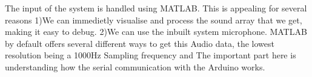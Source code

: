 The input of the system is handled using MATLAB. This is appealing for several reasons 
1)We can immedietly visualise and process the sound array that we get, making it easy to debug. 
2)We can use the inbuilt system microphone. 
MATLAB by default offers several different ways to get this Audio data, the lowest resolution being a 1000Hz Sampling frequency and 
The important part here is understanding how the serial communication with the Arduino works. 